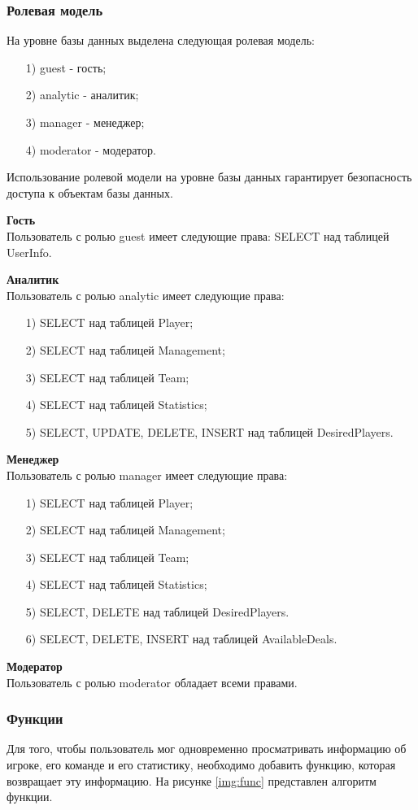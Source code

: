 \subsubsection{Ролевая модель}
На уровне базы данных выделена следующая ролевая модель:
\begin{itemize}
	\item[1)] guest - гость;
	\item[2)] analytic - аналитик;
	\item[3)] manager - менеджер;
	\item[4)] moderator - модератор.  
\end{itemize}
Использование ролевой модели на уровне базы данных гарантирует безопасность доступа к объектам базы данных.

\textbf{Гость}\\
Пользователь с ролью guest имеет следующие права: SELECT над таблицей UserInfo.

\textbf{Аналитик}\\
Пользователь с ролью analytic имеет следующие права:
\begin{itemize}
	\item[1)] SELECT над таблицей Player;
	\item[2)] SELECT над таблицей Management; 
	\item[3)] SELECT над таблицей Team;
	\item[4)] SELECT над таблицей Statistics;
	\item[5)] SELECT, UPDATE, DELETE, INSERT над таблицей DesiredPlayers.    
\end{itemize}

\textbf{Менеджер}\\
Пользователь с ролью manager имеет следующие права:
\begin{itemize}
	\item[1)] SELECT над таблицей Player;
	\item[2)] SELECT над таблицей Management; 
	\item[3)] SELECT над таблицей Team;
	\item[4)] SELECT над таблицей Statistics;
	\item[5)] SELECT, DELETE над таблицей DesiredPlayers.    
	\item[6)] SELECT, DELETE, INSERT над таблицей AvailableDeals.
\end{itemize}
\textbf{Модератор}\\
Пользователь с ролью moderator обладает всеми правами.

\subsubsection{Функции}
Для того, чтобы пользователь мог одновременно просматривать информацию об игроке, его команде и его статистику, необходимо добавить функцию, которая возвращает эту информацию. На рисунке \ref{img:func} представлен алгоритм функции.

